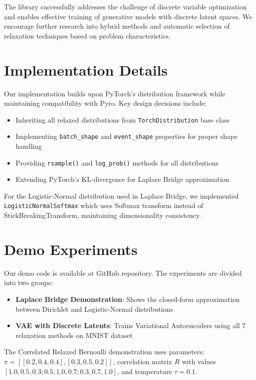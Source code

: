 \documentclass[peerreview]{IEEEtran}
\begin{document}
The library successfully addresses the challenge of discrete variable optimization and enables effective training of generative models with discrete latent spaces. We encourage further research into hybrid methods and automatic selection of relaxation techniques based on problem characteristics.

\appendices
\section{Implementation Details}
Our implementation builds upon PyTorch's distribution framework while maintaining compatibility with Pyro. Key design decisions include:

\begin{itemize}
\item Inheriting all relaxed distributions from \texttt{TorchDistribution} base class
\item Implementing \texttt{batch\_shape} and \texttt{event\_shape} properties for proper shape handling
\item Providing \texttt{rsample()} and \texttt{log\_prob()} methods for all distributions
\item Extending PyTorch's KL-divergence for Laplace Bridge approximation
\end{itemize}

For the Logistic-Normal distribution used in Laplace Bridge, we implemented \texttt{LogisticNormalSoftmax} which uses Softmax transform instead of StickBreakingTransform, maintaining dimensionality consistency.

\section{Demo Experiments}
Our demo code is available at GitHub repository. The experiments are divided into two groups:

\begin{itemize}
\item \textbf{Laplace Bridge Demonstration}: Shows the closed-form approximation between Dirichlet and Logistic-Normal distributions
\item \textbf{VAE with Discrete Latents}: Trains Variational Autoencoders using all 7 relaxation methods on MNIST dataset
\end{itemize}

The Correlated Relaxed Bernoulli demonstration uses parameters: $\pi = [[0.2, 0.4, 0.4], [0.3, 0.5, 0.2]]$, correlation matrix $R$ with values $[1.0, 0.5, 0.3; 0.5, 1.0, 0.7; 0.3, 0.7, 1.0]$, and temperature $\tau = 0.1$.
\end{document}
